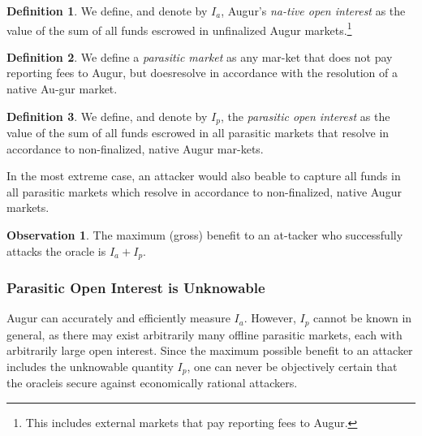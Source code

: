 \documentclass[12pt,floatfix,reprint,nofootinbib,amsmath,amssymb,epsfig,pre,floats,letterpaper,groupedaffiliation]{revtex4-1}
\theoremstyle{definition}
\newtheorem{observation}{Observation}
\theoremstyle{definition}
\newtheorem{definition}{Definition}
\begin{document}
\begin{definition}
We define, and denote by $I_a$, Augur's \textit{na-\linebreak tive open interest} as the value of the sum of all funds escrowed in unfinalized Augur markets.\footnote{This includes external markets that pay reporting fees to Augur.}
\end{definition}

\begin{definition}
We define a \textit{parasitic market} as any mar-\linebreak ket that does not pay reporting fees to Augur, but does\linebreak resolve in accordance with the resolution of a native Au-\linebreak gur market.
\end{definition}

\begin{definition}
We define, and denote by $I_p$, the \textit{parasitic open interest} as the value of the sum of all funds escrowed in all parasitic markets that resolve in accordance to non-finalized, native Augur mar-\linebreak kets.
\end{definition}

In the most extreme case, an attacker would also be\linebreak able to capture all funds in all parasitic markets which resolve in accordance to non-finalized, native Augur markets.

\begin{observation}
The maximum (gross) benefit to an at-\linebreak tacker who successfully attacks the oracle is $I_a + I_p$.
\end{observation}

\subsubsection{Parasitic Open Interest is Unknowable}

Augur can accurately and efficiently measure $I_a$. However, $I_p$ cannot be known in general, as there may exist arbitrarily many offline parasitic markets, each with arbitrarily large open interest. Since the maximum possible benefit to an attacker includes the unknowable quantity $I_p$, one can never be objectively certain that the oracle\linebreak is secure against economically rational attackers.
\end{document}
